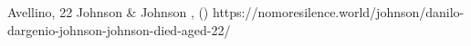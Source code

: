           {Avellino, }
          {22}
          {Johnson \& Johnson }
          {}
          {
            ,
             ()
          }
          {https://nomoresilence.world/johnson/danilo-dargenio-johnson-johnson-died-aged-22/}

